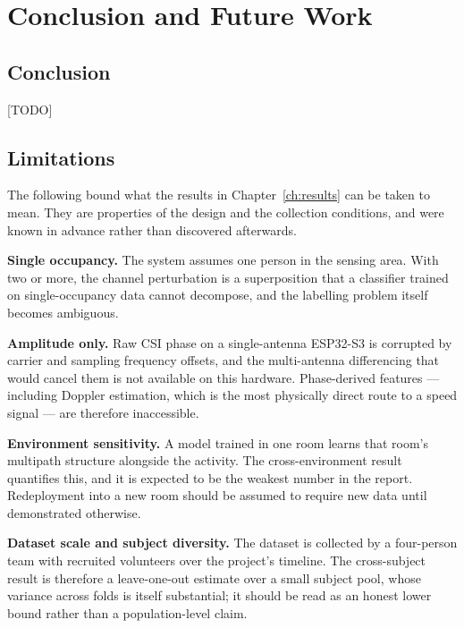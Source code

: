 \chapter{Conclusion and Future Work}
\label{ch:conclusion}

\section{Conclusion}
[TODO]

\section{Limitations}

The following bound what the results in Chapter~\ref{ch:results} can be
taken to mean. They are properties of the design and the collection
conditions, and were known in advance rather than discovered afterwards.

\textbf{Single occupancy.} The system assumes one person in the sensing
area. With two or more, the channel perturbation is a superposition that a
classifier trained on single-occupancy data cannot decompose, and the
labelling problem itself becomes ambiguous.

\textbf{Amplitude only.} Raw CSI phase on a single-antenna ESP32-S3 is
corrupted by carrier and sampling frequency offsets, and the multi-antenna
differencing that would cancel them is not available on this hardware.
Phase-derived features --- including Doppler estimation, which is the most
physically direct route to a speed signal --- are therefore inaccessible.

\textbf{Environment sensitivity.} A model trained in one room learns that
room's multipath structure alongside the activity. The cross-environment
result quantifies this, and it is expected to be the weakest number in the
report. Redeployment into a new room should be assumed to require new data
until demonstrated otherwise.

\textbf{Dataset scale and subject diversity.} The dataset is collected by a
four-person team with recruited volunteers over the project's timeline. The
cross-subject result is therefore a leave-one-out estimate over a small
subject pool, whose variance across folds is itself substantial; it should
be read as an honest lower bound rather than a population-level claim.

